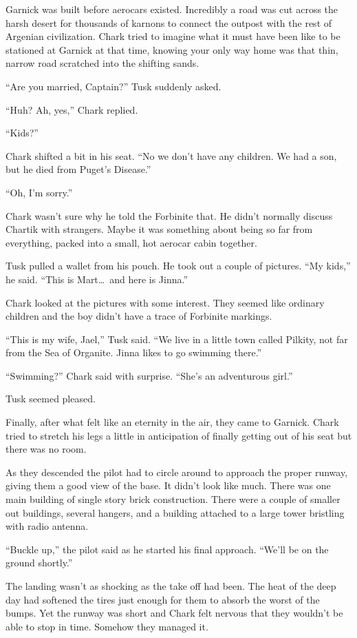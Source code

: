 Garnick was built before aerocars existed. Incredibly a road was cut across the harsh desert for
thousands of karnons to connect the outpost with the rest of Argenian civilization. Chark tried
to imagine what it must have been like to be stationed at Garnick at that time, knowing your
only way home was that thin, narrow road scratched into the shifting sands.

``Are you married, Captain?'' Tusk suddenly asked.

``Huh? Ah, yes,'' Chark replied.

``Kids?''

Chark shifted a bit in his seat. ``No we don't have any children. We had a son, but he died from
Puget's Disease.''

``Oh, I'm sorry.''

Chark wasn't sure why he told the Forbinite that. He didn't normally discuss Chartik with
strangers. Maybe it was something about being so far from everything, packed into a small, hot
aerocar cabin together.

Tusk pulled a wallet from his pouch. He took out a couple of pictures. ``My kids,'' he said.
``This is Mart\ldots\ and here is Jinna.''

Chark looked at the pictures with some interest. They seemed like ordinary children and the boy
didn't have a trace of Forbinite markings.

``This is my wife, Jael,'' Tusk said. ``We live in a little town called Pilkity, not far from
the Sea of Organite. Jinna likes to go swimming there.''

``Swimming?'' Chark said with surprise. ``She's an adventurous girl.''

Tusk seemed pleased.

Finally, after what felt like an eternity in the air, they came to Garnick. Chark tried to
stretch his legs a little in anticipation of finally getting out of his seat but there was no
room.

As they descended the pilot had to circle around to approach the proper runway, giving them a
good view of the base. It didn't look like much. There was one main building of single story
brick construction. There were a couple of smaller out buildings, several hangers, and a
building attached to a large tower bristling with radio antenna.

``Buckle up,'' the pilot said as he started his final approach. ``We'll be on the ground
shortly.''

The landing wasn't as shocking as the take off had been. The heat of the deep day had softened
the tires just enough for them to absorb the worst of the bumps. Yet the runway was short and
Chark felt nervous that they wouldn't be able to stop in time. Somehow they managed it.

